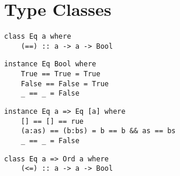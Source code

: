 \section{Type Classes}


\begin{verbatim}
class Eq a where
    (==) :: a -> a -> Bool
\end{verbatim}

\begin{verbatim}
instance Eq Bool where
    True == True = True
    False == False = True
    _ == _ = False
\end{verbatim}

\begin{verbatim}
instance Eq a => Eq [a] where
    [] == [] == rue
    (a:as) == (b:bs) = b == b && as == bs
    _ == _ = False
\end{verbatim}

\begin{verbatim}
class Eq a => Ord a where
    (<=) :: a -> a -> Bool
\end{verbatim}
